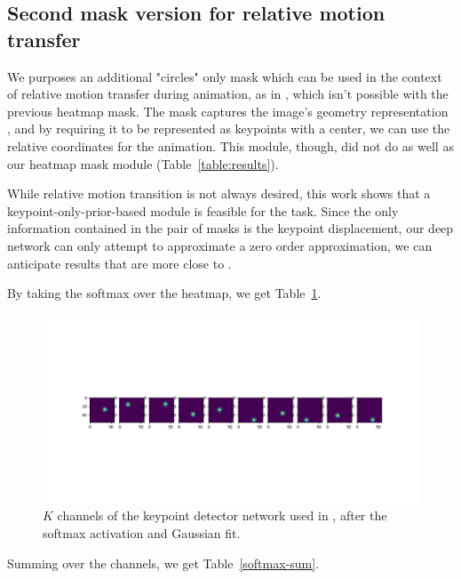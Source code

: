 \documentclass{article}
\begin{document}
\subsection{Second mask version for relative motion transfer}
We purposes an additional "circles" only mask
which can be used in the context
of relative motion transfer during animation, as in
\cite{siarohin2020order}, which isn't possible with the previous heatmap mask.
The mask captures the image's geometry representation \cite{wu2019transgaga},
and by requiring it to be represented as keypoints with a center, we can use
the relative coordinates for the animation. This module, though, did not do
as well as our heatmap mask module (Table~\ref{table:results}).

While relative motion transition is not always desired, this work shows that
a keypoint-only-prior-based module is feasible for the task.
Since the only information contained in the pair of masks is the keypoint
displacement, our deep network can only attempt to approximate a zero order
approximation, we can anticipate results that are more close to
\cite{siarohin2019animating}.

By taking the softmax over the heatmap, we get Table~\ref{softmax-10kp}.
\begin{figure}[ht]
\vskip 0.2in
\begin{center}
\centerline{\includegraphics[width=\columnwidth]{visualizations/softmax_10kp}}
\caption{
$K$ channels of the keypoint detector network used in
\cite{siarohin2020order}, after the softmax activation and Gaussian fit.
}
\label{softmax-10kp}
\end{center}
\vskip -0.2in
\end{figure}

Summing over the channels, we get Table~\ref{softmax-sum}.
\end{document}
